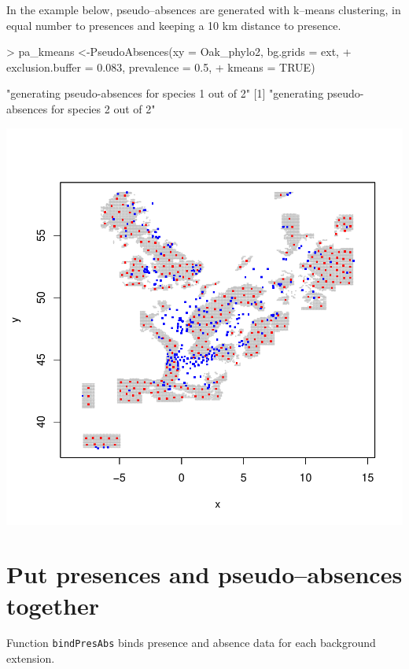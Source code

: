 \documentclass[10pt,a4paper]{report}
\begin{document}
In the example below, pseudo--absences are generated with k--means clustering, in equal number to presences and keeping a 10 km distance to presence.

\begin{Schunk}
\begin{Sinput}
> pa_kmeans <-PseudoAbsences(xy = Oak_phylo2, bg.grids = ext, 
+ 	exclusion.buffer = 0.083, prevalence = 0.5, 
+   kmeans = TRUE)
\end{Sinput}
\begin{Soutput}
[1] "generating pseudo-absences for species 1 out of 2"
[1] "generating pseudo-absences for species 2 out of 2"
\end{Soutput}
\end{Schunk}
\includegraphics{mopa-mopa10}

\section{Put presences and pseudo--absences together}

Function \texttt{bindPresAbs} binds presence and absence data for each background extension.
\end{document}
